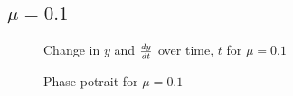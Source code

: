 \documentclass{article}
\begin{document}
\subsection{$\mu=0.1$}
\begin{figure}[H]
\centering 
\noindent{}%
\caption{Change in $y$ and $dy \over dt$  over time, $t$ for $\mu=0.1$}
\end{figure}
\begin{figure}[H]
\centering 
\noindent{}%
\caption{Phase potrait for $\mu=0.1$}
\end{figure}
\end{document}
